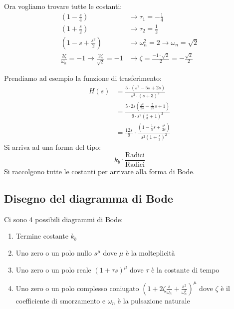 \documentclass[a4paper]{article}
\begin{document}
\begin{example}
  \vspace{1em}
  \noindent
  Ora vogliamo trovare tutte le costanti:
  \[
    \begin{aligned}
      \left( 1 - \frac{s}{4} \right) &\to \tau_1 = -\frac{1}{4}\\
      \left( 1 + \frac{s}{2} \right) &\to \tau_2 = \frac{1}{2}\\
      \left( 1 - s + \frac{s^2}{2} \right) &\to \omega_n^2 = 2 \to \omega_n = \sqrt{2}\\
      \frac{2 \zeta}{\omega_n} = -1 \to \frac{2 \zeta}{\sqrt{2} }= -1 &\to \zeta = \frac{-1 \cdot \sqrt{2} }{2} = - \frac{\sqrt{2} }{2}
    \end{aligned}
  \] 
\end{example}

\begin{example}
  Prendiamo ad esempio la funzione di trasferimento:
  \[
  \begin{aligned}
    H(s) &= \frac{
      5 \cdot  \left( s ^2 - 5s + 2s \right) 
    }{
      s ^2 \cdot \left( s + 3 \right) ^2
    }\\
    &= \frac{
      5 \cdot 2s \left( \frac{s ^2}{2s} - \frac{5}{2s}s + 1 \right) 
    }{
      9 \cdot s ^2 \left( \frac{s}{3} + 1 \right) ^2
    }\\
    &= \frac{12s}{9} \cdot \frac{
      \left( 1 - \frac{1}{5}s + \frac{s ^2}{2s} \right) 
    }{
      s ^2 \left( 1 + \frac{s}{3} \right) ^2
    }
  \end{aligned}
  \] 
  Si arriva ad una forma del tipo:
  \[
    k_b \cdot \frac{\text{Radici}}{\text{Radici}}
  \] 
  Si raccolgono tutte le costanti per arrivare alla forma di Bode.

  \vspace{1em}
  \noindent
\end{example}

\subsection{Disegno del diagramma di Bode}
Ci sono 4 possibili diagrammi di Bode:
\begin{enumerate}
  \item Termine costante \( k_b \) 
  \item Uno zero o un polo nullo \( s^{\mu} \) dove \( \mu \) è la molteplicità
  \item Uno zero o un polo reale \( \left( 1 + \tau s \right)^{\mu} \)
    dove \( \tau \) è la costante di tempo
  \item Uno zero o un polo complesso coniugato \( \left( 1 + 2 \zeta \frac{s}{\omega_n} + \frac{s^2}{\omega_n^2} \right)^{\mu} \)
    dove \( \zeta \) è il coefficiente di smorzamento e \( \omega_n \) è la pulsazione naturale
\end{enumerate}
\end{document}
